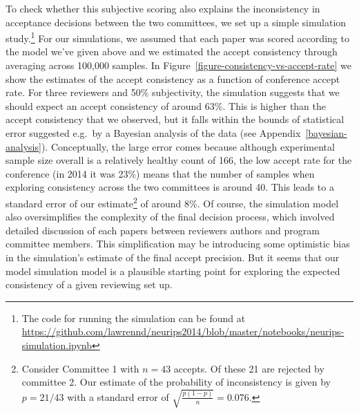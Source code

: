 \documentclass[twoside]{article}
\begin{document}
To check whether this subjective scoring also explains the
inconsistency in acceptance decisions between the two committees, we set up a
simple simulation study.\footnote{The code for running the simulation can be found at \url{https://github.com/lawrennd/neurips2014/blob/master/notebooks/neurips-simulation.ipynb}} For our simulations, we assumed that each
paper was scored according to the model we've given above and we
estimated the accept consistency through averaging across 100,000
samples. In Figure~\ref{figure-consistency-vs-accept-rate} we show the
estimates of the accept consistency as a function of conference accept
rate. For three reviewers and 50\% subjectivity, the simulation
suggests that we should expect an accept consistency of around
63\%. This is higher than the accept consistency that we observed, but
it falls within the bounds of statistical error suggested e.g.\ by a
Bayesian analysis of the data (see Appendix~\ref{bayesian-analysis}). Conceptually, the large error comes because
although experimental sample size overall is a relatively healthy count of 166,
the low accept rate for the conference (in 2014 it was 23\%) means that the number of
samples when exploring consistency across the two committees is around
40. This leads to a standard error of our
estimate\footnote{Consider Committee 1 with $n=43$ accepts. Of these
  21 are rejected by committee 2. Our estimate of the probability of
  inconsistency is given by $p=21/43$ with a standard error of
  $\sqrt{\frac{p(1-p)}{n}} = 0.076$.} of around 8\%.  Of course, the
simulation model also oversimplifies the complexity of the final
decision process, which involved detailed discussion of each papers
between reviewers authors and program committee members. This
simplification may be introducing some optimistic bias in the
simulation's estimate of the final accept precision. But it seems that
our model simulation model is a plausible starting point for exploring
the expected consistency of a given reviewing set up.
\end{document}
